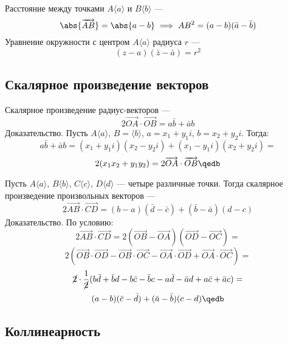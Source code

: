 {\bold Расстояние} между точками $A\langle a\rangle$ и $B\langle b\rangle$ ---
$$\abs{\overrightarrow{AB}}=\abs{a-b}\implies AB^2=(a-b)(\bar{a}-\bar{b})$$
{\ital Уравнение окружности} с центром $A\langle a\rangle$ радиуса $r$ ---
$$(z-a)(\bar{z}-\bar{a})=r^2$$

\subsection{Скалярное произведение векторов}

{\ital Скалярное произведение радиус-векторов} ---
$$2\overrightarrow{OA}\cdot\overrightarrow{OB}=a\bar{b}+\bar{a}b$$
{\bold Доказательство.} Пусть $A\langle a\rangle$, $B=\langle b\rangle$, $a=x_1+y_1i$, $b=x_2+y_2i$. Тогда:
$$a\bar{b}+\bar{a}b=(x_1+y_1i)(x_2-y_2i)+(x_1-y_1i)(x_2+y_2i)=$$
$$2(x_1x_2+y_1y_2)=2\overrightarrow{OA}\cdot\overrightarrow{OB}\qedb$$

Пусть $A\langle a\rangle$, $B\langle b\rangle$, $C\langle c\rangle$, $D\langle d\rangle$ --- четыре различные точки. Тогда {\ital скалярное произведение произвольных векторов} ---
$$2\overrightarrow{AB}\cdot\overrightarrow{CD}=(b-a)(\bar{d}-\bar{c})+(\bar{b}-\bar{a})(d-c)$$
{\bold Доказательство.} По условию:
$$2\overrightarrow{AB}\cdot\overrightarrow{CD}=2(\overrightarrow{OB}-\overrightarrow{OA})(\overrightarrow{OD}-\overrightarrow{OC})=$$
$$2(\overrightarrow{OB}\cdot\overrightarrow{OD}-\overrightarrow{OB}\cdot\overrightarrow{OC}-\overrightarrow{OA}\cdot\overrightarrow{OD}+\overrightarrow{OA}\cdot\overrightarrow{OC})=$$
$$\cancel{2}\cdot\frac{1}{\cancel{2}}(b\bar{d}+\bar{b}d-b\bar{c}-\bar{b}c-a\bar{d}-\bar{a}d+a\bar{c}+\bar{a}c)=$$
$$(a-b)(\bar{c}-\bar{d})+(\bar{a}-\bar{b})(c-d)\qedb$$

\subsection{Коллинеарность}

